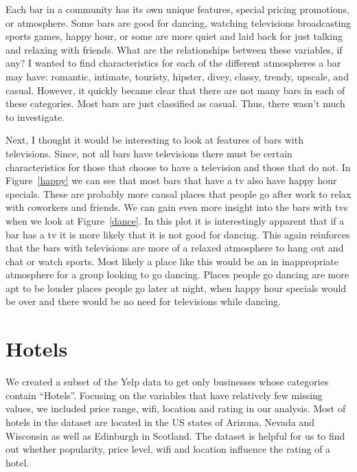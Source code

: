 \documentclass[11pt]{article}
\begin{document}
\vspace{5mm}
Each bar in a community has its own unique features, special pricing promotions, or atmosphere.  Some bars are good for dancing, watching televisions broadcasting sports games, happy hour, or some are more quiet and laid back for just talking and relaxing with friends.  What are the relationships between these variables, if any?  I wanted to find characteristics for each of the  different atmospheres a bar may have: romantic, intimate, touristy, hipster, divey, classy, trendy, upscale, and casual.  However, it quickly became clear that there are not many bars in each of these categories.  Most bars are just classified as casual.  Thus, there wasn't much to investigate.



Next, I thought it would be interesting to look at features of bars with televisions.  Since, not all bars have televisions there must be certain characteristics for those that choose to have a television and those that do not.   In  Figure~\ref{happy} we can see that most bars that have a tv also have happy hour specials.  These are probably more causal places that people go after work to relax with coworkers and friends.  We can gain even more insight into the bars with tvs when we look at  Figure~\ref{dance}.  In this plot it is interestingly apparent that if a bar has a tv it is more likely that it is not good for dancing.  This again reinforces that the bars with televisions are more of a relaxed atmosphere to hang out and chat or watch sports.  Most likely a place like this would be an in inappropriate atmosphere for a group looking to go dancing.  Places people go dancing are more apt to be louder places people go later at night, when happy hour specials would be over and there would be no need for televisions while dancing.  






\section{Hotels}

We created a subset of the Yelp data to get only businesses whose categories contain “Hotels”. Focusing on the variables that have relatively few missing values, we included price range, wifi, location and rating in our analysis. Most of hotels in the dataset are located in the US states of Arizona, Nevada and Wisconsin as well as Edinburgh in Scotland. The dataset is helpful for us to find out whether popularity, price level, wifi and location influence the rating of a hotel.
\end{document}

